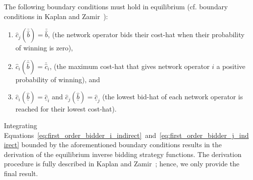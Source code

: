 The following boundary conditions must hold in equilibrium (cf. boundary conditions in Kaplan and Zamir~\cite{KaplanZamir2007}):
\begin{enumerate}
  \item $\hat{c}_j(\bar{\hat{b}}) = \bar{\hat{b}}$, (the network operator bids their cost-hat when their probability of winning is zero),
  \item $\hat{c}_i(\bar{\hat{b}}) = \bar{\hat{c}}_i$, (the maximum cost-hat that gives network operator $i$ a positive probability of winning), and
  \item $\hat{c}_i(\underline{\hat{b}}) = \underline{\hat{c}}_i$ and $\hat{c}_j(\underline{\hat{b}}) = \underline{\hat{c}}_j$ (the lowest bid-hat of each network operator is reached for their lowest cost-hat).
\end{enumerate}
Integrating Equations~\eqref{eq:first_order_bidder_i_indirect}~and~\eqref{eq:first_order_bidder_j_indirect} bounded by the aforementioned boundary conditions results in the derivation of the equilibrium inverse bidding strategy functions. The derivation procedure is fully described in Kaplan and Zamir~\cite{KaplanZamir2007}; hence, we only provide the final result.
